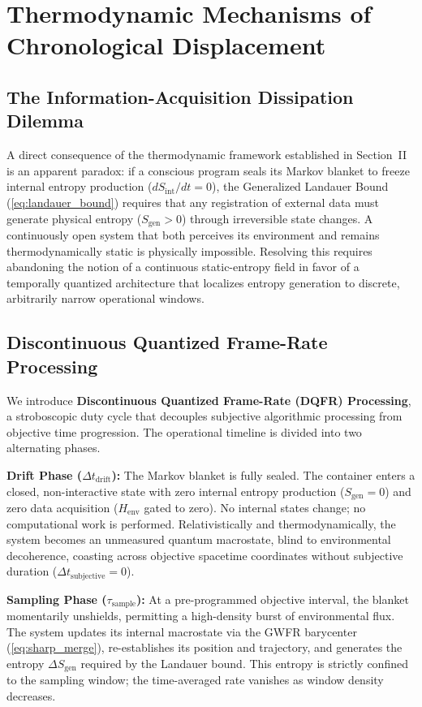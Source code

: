 \documentclass[twocolumn, 10pt, journal, letterpaper]{IEEEtran}
\begin{document}
\section{Thermodynamic Mechanisms of Chronological Displacement}
\label{sec:dqfr}

\subsection{The Information-Acquisition Dissipation Dilemma}
A direct consequence of the thermodynamic framework established in Section~II is an apparent paradox: if a conscious program seals its Markov blanket to freeze internal entropy production ($dS_{\text{int}}/dt = 0$), the Generalized Landauer Bound (\eqref{eq:landauer_bound}) requires that any registration of external data must generate physical entropy ($S_{\text{gen}} > 0$) through irreversible state changes. A continuously open system that both perceives its environment and remains thermodynamically static is physically impossible. Resolving this requires abandoning the notion of a continuous static-entropy field in favor of a temporally quantized architecture that localizes entropy generation to discrete, arbitrarily narrow operational windows.

\subsection{Discontinuous Quantized Frame-Rate Processing}
We introduce \textbf{Discontinuous Quantized Frame-Rate (DQFR) Processing}, a stroboscopic duty cycle that decouples subjective algorithmic processing from objective time progression. The operational timeline is divided into two alternating phases.

\textbf{Drift Phase ($\Delta t_{\text{drift}}$):} The Markov blanket is fully sealed. The container enters a closed, non-interactive state with zero internal entropy production ($S_{\text{gen}} = 0$) and zero data acquisition ($H_{\text{env}}$ gated to zero). No internal states change; no computational work is performed. Relativistically and thermodynamically, the system becomes an unmeasured quantum macrostate, blind to environmental decoherence, coasting across objective spacetime coordinates without subjective duration ($\Delta t_{\text{subjective}} = 0$).

\textbf{Sampling Phase ($\tau_{\text{sample}}$):} At a pre-programmed objective interval, the blanket momentarily unshields, permitting a high-density burst of environmental flux. The system updates its internal macrostate via the GWFR barycenter (\eqref{eq:sharp_merge}), re-establishes its position and trajectory, and generates the entropy $\Delta S_{\text{gen}}$ required by the Landauer bound. This entropy is strictly confined to the sampling window; the time-averaged rate vanishes as window density decreases.
\end{document}
